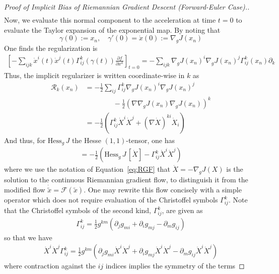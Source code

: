 \documentclass[reqno,11pt,letterpaper]{amsart}
\theoremstyle{plain}
\theoremstyle{definition}
\theoremstyle{remark}
\newcommand{\rgrad}{\nabla_{\!g}}
\newcommand{\Fimp}{\mathcal{R}}
\begin{document}
\begin{proof}[Proof of Implicit Bias of Riemannian Gradient Descent (Forward-Euler Case).]
\begin{align*}
\end{align*}
Now, we evaluate this normal component to the acceleration at time $t=0$ to evaluate the Taylor expansion of the exponential map. By noting that
\[
\gamma(0) := x_{n}, \quad \gamma'(0) = \Dot{x}(0) := \rgrad J (x_{n})
\]
One finds the regularization is
\begin{align}
    \left[ - \sum_{ijk} \Dot{x}^{i} (t) \Dot{x}^{j}(t) \Gamma_{ij}^{k}(\gamma(t)) \frac{\partial f}{\partial x^{k}} \right]_{t=0} = - \sum_{ijk} {\rgrad J (x_{n})}^{i} \rgrad J (x_{n})^{j} \Gamma_{ij}^{k}(x_{n}) \partial_{k}
\end{align}
Thus, the implicit regularizer is written coordinate-wise in $k$ as
\begin{align*}
     \Fimp_{k} (x_{n}) & =   - \frac{1}{2} \sum_{ij} \Gamma_{ij}^{k} \rgrad J(x_{n})^{i} \rgrad J(x_{n})^{j} \\ & \qquad \qquad -\frac{1}{2}  (\nabla \rgrad J(x_{n})\rgrad J(x_{n}))^{k} \\
    &= - \frac{1}{2} \left( \Gamma_{ij}^{k}  \Dot{X}^{i} \Dot{X}^{j} +  (\nabla \Dot{X} )^{ki} \Dot{X}_{i} \right) 
\end{align*}
And thus, for $\mathrm{Hess}_{g} \, J$ the Hesse $(1,1)$-tensor, one has
\begin{align*}
    = - \frac{1}{2} \left( 
    \mathrm{Hess}_{g} \,J \, [ \dot{X} ] - 
    \Gamma_{ij}^{k}  \Dot{X}^{i} \Dot{X}^{j} \right)
\end{align*}
where we use the notation of Equation~\ref{eq:RGF} that $\Dot{X} = - \rgrad J (X)$ is the solution to the continuous Riemannian gradient flow, to distinguish it from the modified flow $\Dot{\tilde{x}} = \mathcal{F}(\tilde{x})$. One may rewrite this flow concisely with a simple operator which does not require evaluation of the Christoffel symbols $\Gamma_{ij}^{k}$. Note that the Christoffel symbols of the second kind, $\Gamma_{ij}^{k}$, are given as
\begin{align*}
    \Gamma_{ij}^{k} = \frac{1}{2} g^{km} \left(
    \partial_{j} g_{mi} + \partial_{i} g_{mj} - \partial_{m} g_{ij}
    \right)
\end{align*}
so that we have
\begin{align*}
    \Dot{X}^{i} \Dot{X}^{j} \Gamma_{ij}^{k} = \frac{1}{2} g^{km} \left(
    \partial_{j} g_{mi} \Dot{X}^{i} \Dot{X}^{j} + \partial_{i} g_{mj} \Dot{X}^{i} \Dot{X}^{j} - \partial_{m} g_{ij} \Dot{X}^{i} \Dot{X}^{j}
    \right)
\end{align*}
where contraction against the $ij$ indices implies the symmetry of the terms

\end{proof}
\end{document}
